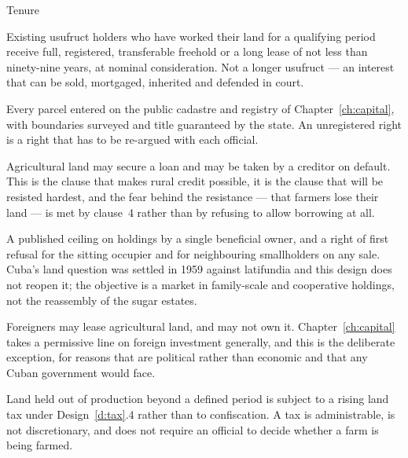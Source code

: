 \begin{design}{Tenure}
\label{d:tenure}
\begin{rules}
 Existing usufruct holders who have worked
their land for a qualifying period receive full, registered, transferable
freehold or a long lease of not less than ninety-nine years, at nominal
consideration. Not a longer usufruct --- an interest that can be sold, mortgaged,
inherited and defended in court.

 Every parcel entered on the public cadastre and registry of
Chapter~\ref{ch:capital}, with boundaries surveyed and title guaranteed by the
state. An unregistered right is a right that has to be re-argued with each
official.

 Agricultural land may secure a loan and may be taken by a
creditor on default. This is the clause that makes rural credit possible, it is
the clause that will be resisted hardest, and the fear behind the resistance ---
that farmers lose their land --- is met by clause~4 rather than by refusing to
allow borrowing at all.

 A published ceiling on holdings by a single beneficial
owner, and a right of first refusal for the sitting occupier and for neighbouring
smallholders on any sale. Cuba's land question was settled in 1959 against
latifundia and this design does not reopen it; the objective is a market in
family-scale and cooperative holdings, not the reassembly of the sugar estates.

 Foreigners may lease agricultural land, and may not
own it. Chapter~\ref{ch:capital} takes a permissive line on foreign investment
generally, and this is the deliberate exception, for reasons that are political
rather than economic and that any Cuban government would face.

 Land held out of production beyond a defined period is subject to
a rising land tax under Design~\ref{d:tax}.4 rather than to confiscation. A tax
is administrable, is not discretionary, and does not require an official to
decide whether a farm is being farmed.
\end{rules}
\end{design}

